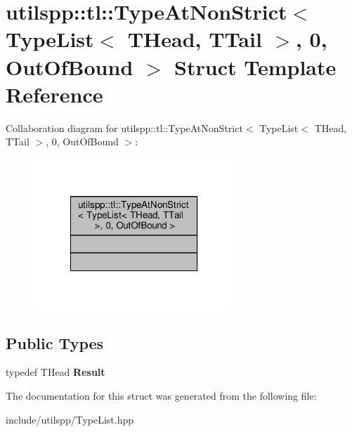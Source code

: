 \hypertarget{structutilspp_1_1tl_1_1TypeAtNonStrict_3_01TypeList_3_01THead_00_01TTail_01_4_00_010_00_01OutOfBound_01_4}{\section{utilspp\-:\-:tl\-:\-:Type\-At\-Non\-Strict$<$ Type\-List$<$ T\-Head, T\-Tail $>$, 0, Out\-Of\-Bound $>$ Struct Template Reference}
\label{structutilspp_1_1tl_1_1TypeAtNonStrict_3_01TypeList_3_01THead_00_01TTail_01_4_00_010_00_01OutOfBound_01_4}
}


Collaboration diagram for utilspp\-:\-:tl\-:\-:Type\-At\-Non\-Strict$<$ Type\-List$<$ T\-Head, T\-Tail $>$, 0, Out\-Of\-Bound $>$\-:
\nopagebreak
\begin{figure}[H]
\begin{center}
\leavevmode
\includegraphics[width=214pt]{structutilspp_1_1tl_1_1TypeAtNonStrict_3_01TypeList_3_01THead_00_01TTail_01_4_00_010_00_01OutOfBound_01_4__coll__graph}
\end{center}
\end{figure}
\subsection*{Public Types}
\begin{DoxyCompactItemize}
\item 
\hypertarget{structutilspp_1_1tl_1_1TypeAtNonStrict_3_01TypeList_3_01THead_00_01TTail_01_4_00_010_00_01OutOfBound_01_4_a03bcdd25fb77e439c64ecdcfaa318d4b}{typedef T\-Head {\bfseries Result}}\label{structutilspp_1_1tl_1_1TypeAtNonStrict_3_01TypeList_3_01THead_00_01TTail_01_4_00_010_00_01OutOfBound_01_4_a03bcdd25fb77e439c64ecdcfaa318d4b}

\end{DoxyCompactItemize}


The documentation for this struct was generated from the following file\-:\begin{DoxyCompactItemize}
\item 
include/utilspp/Type\-List.\-hpp\end{DoxyCompactItemize}
